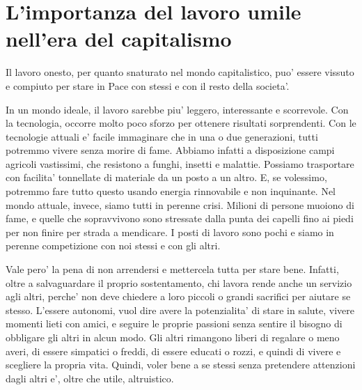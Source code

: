 \chapter{L'importanza del lavoro umile nell'era del capitalismo}

\label{altruismoLavoro}

Il lavoro onesto, per quanto snaturato nel mondo capitalistico, puo' essere vissuto e compiuto per stare in Pace con stessi e con il resto della societa'. 

In un mondo ideale, il lavoro sarebbe piu' leggero, interessante e scorrevole. Con la tecnologia, occorre molto poco sforzo per ottenere risultati sorprendenti. Con le tecnologie attuali e' facile immaginare che in una o due generazioni, tutti potremmo vivere senza morire di fame. Abbiamo infatti a disposizione campi agricoli vastissimi, che resistono a funghi, insetti e malattie. Possiamo trasportare con facilita' tonnellate di materiale da un posto a un altro. E, se volessimo, potremmo fare tutto questo usando energia rinnovabile e non inquinante. Nel mondo attuale, invece, siamo tutti in perenne crisi. Milioni di persone muoiono di fame, e quelle che sopravvivono sono stressate dalla punta dei capelli fino ai piedi per non finire per strada a mendicare. I posti di lavoro sono pochi e siamo in perenne competizione con noi stessi e con gli altri.

Vale pero' la pena di non arrendersi e mettercela tutta per stare bene. Infatti, oltre a salvaguardare il proprio sostentamento, chi lavora rende anche un servizio agli altri, perche' non deve chiedere a loro piccoli o grandi sacrifici per aiutare se stesso. 
L'essere autonomi, vuol dire avere la potenzialita' di stare in salute, vivere momenti lieti con amici, e seguire le proprie passioni senza sentire il bisogno di obbligare gli altri in alcun modo. Gli altri rimangono liberi di regalare o meno averi, di essere simpatici o freddi, di essere educati o rozzi, e quindi di vivere e scegliere la propria vita.
Quindi, voler bene a se stessi senza pretendere attenzioni dagli altri e', oltre che utile, altruistico. 

